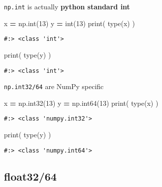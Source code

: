 \documentclass[
]{book}
\newenvironment{Shaded}{\begin{snugshade}}{\end{snugshade}}
\newcommand{\BuiltInTok}[1]{#1}
\newcommand{\DecValTok}[1]{\textcolor[rgb]{0.06,0.06,0.06}{#1}}
\newcommand{\NormalTok}[1]{#1}
\newcommand{\OperatorTok}[1]{\textcolor[rgb]{0.43,0.43,0.43}{\textbf{#1}}}
\begin{document}
\texttt{np.int} is actually \textbf{python standard int}

\begin{Shaded}
\begin{Highlighting}[]
\NormalTok{x }\OperatorTok{=}\NormalTok{ np.}\BuiltInTok{int}\NormalTok{(}\DecValTok{13}\NormalTok{)}
\NormalTok{y }\OperatorTok{=} \BuiltInTok{int}\NormalTok{(}\DecValTok{13}\NormalTok{)}
\BuiltInTok{print}\NormalTok{( }\BuiltInTok{type}\NormalTok{(x) )}
\end{Highlighting}
\end{Shaded}

\begin{verbatim}
#:> <class 'int'>
\end{verbatim}

\begin{Shaded}
\begin{Highlighting}[]
\BuiltInTok{print}\NormalTok{( }\BuiltInTok{type}\NormalTok{(y) )}
\end{Highlighting}
\end{Shaded}

\begin{verbatim}
#:> <class 'int'>
\end{verbatim}

\texttt{np.int32/64} are NumPy specific

\begin{Shaded}
\begin{Highlighting}[]
\NormalTok{x }\OperatorTok{=}\NormalTok{ np.int32(}\DecValTok{13}\NormalTok{)}
\NormalTok{y }\OperatorTok{=}\NormalTok{ np.int64(}\DecValTok{13}\NormalTok{)}
\BuiltInTok{print}\NormalTok{( }\BuiltInTok{type}\NormalTok{(x) )}
\end{Highlighting}
\end{Shaded}

\begin{verbatim}
#:> <class 'numpy.int32'>
\end{verbatim}

\begin{Shaded}
\begin{Highlighting}[]
\BuiltInTok{print}\NormalTok{( }\BuiltInTok{type}\NormalTok{(y) )}
\end{Highlighting}
\end{Shaded}

\begin{verbatim}
#:> <class 'numpy.int64'>
\end{verbatim}

\hypertarget{float3264}{%
\subsection{float32/64}\label{float3264}}
\end{document}

